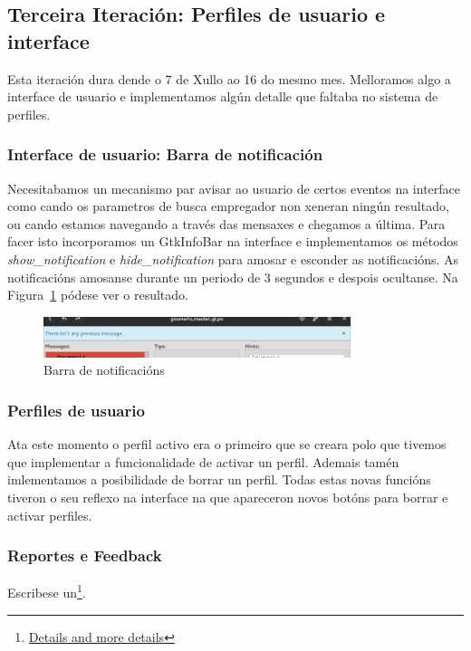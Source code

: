 \subsection{Terceira Iteración: Perfiles de usuario e interface}
Esta iteración dura dende o 7 de Xullo ao 16 do mesmo mes. Melloramos algo a interface de usuario e implementamos algún detalle que faltaba no sistema de perfiles.

\subsubsection{Interface de usuario: Barra de notificación}
Necesitabamos un mecanismo par avisar ao usuario de certos eventos na interface como cando os parametros de busca empregador non xeneran ningún resultado, ou cando estamos navegando a través das mensaxes e chegamos a última. Para facer isto incorporamos un GtkInfoBar na interface e implementamos os métodos \emph{show\_notification} e \emph{hide\_notification} para amosar e esconder as notificacións. As notificacións amosanse durante un periodo de 3 segundos e despois ocultanse. Na Figura~\ref{fig:gsoc2_it3_ui} pódese ver o resultado.

\begin{figure}[h!]
    \centering
    \includegraphics[width=0.8\textwidth]{img/gsoc2_it3_ui.png}
    \caption{Barra de notificacións}
    \label{fig:gsoc2_it3_ui}
\end{figure}

\subsubsection{Perfiles de usuario}
Ata este momento o perfil activo era o primeiro que se creara polo que tivemos que implementar a funcionalidade de activar un perfil. Ademais tamén imlementamos a posibilidade de borrar un perfil. Todas estas novas funcións tiveron o seu reflexo na interface na que apareceron novos botóns para borrar e activar perfiles.

\subsubsection{Reportes e Feedback}

Escribese un\footnote{\href{http://aquelando.info/details-and-more-details/}{Details and more details}}.

